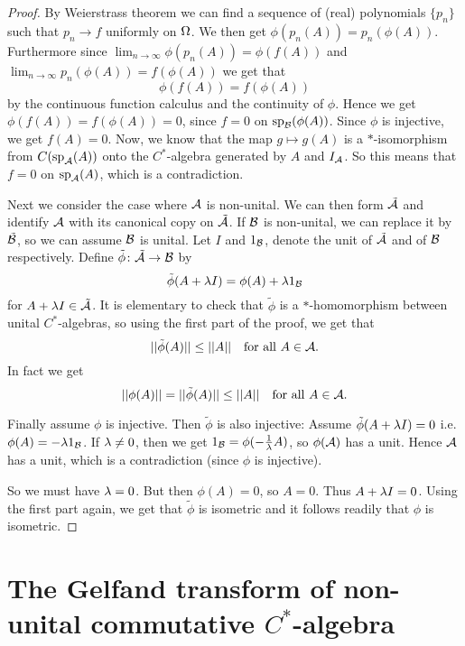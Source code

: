 \documentclass[10pt,english,a4paper]{article}
\theoremstyle{definition}
\DeclareMathOperator{\Sp}{sp}
\begin{document}
\begin{proof}
By Weierstrass theorem we can find a sequence of (real) polynomials $\{p_n\}$
such that $p_n \to f$ uniformly on $\Omega$. We then get $\phi(p_n(A)) = p_n(\phi(A))$. Furthermore 
since $\lim_{n\to\infty} \phi(p_n(A)) = \phi(f(A))$ and $\lim_{n \to \infty}
p_n(\phi(A)) = f(\phi(A))$ we get that \[\phi(f(A)) = f(\phi(A))\] by the
continuous function calculus and the continuity of $\phi$.
Hence we get $\phi(f(A)) = f(\phi(A)) = 0$, since $f = 0$ on $\Sp_{\Bs}(\phi(A))$. 
Since $\phi$ is injective, we get $f(A) = 0$. Now, we know that the map $g \mapsto g(A)$
is a $*$-isomorphism from $C(\Sp_{\As}(A))$ onto the $C^*$-algebra generated 
by $A$ and $I_{\mathcal{A}}$. So this means that $f=0$ on $\Sp_{\As}(A)$, which is a contradiction. 

Next we consider the case where $\mathcal{A}$ is non-unital. 
We can then form $\tilde{\mathcal{A}}$ and identify $\mathcal{A}$ with its canonical copy on $\tilde{\mathcal{A}}$.
If $\mathcal{B}$ is non-unital, we can replace it by $\tilde{\mathcal{B}}$, so we can assume $\mathcal{B}$ is 
unital. Let $I$ and $1_{\mathcal{B}}$, denote the unit of $\tilde{\mathcal{A}}$ and of $\mathcal{B}$ 
respectively. Define $\tilde{\phi}\colon \tilde{\mathcal{A}} \to \mathcal{B}$ by 
\[ \tilde{\phi}(A + \lambda I) = \phi(A) + \lambda 1_{\mathcal{B}} \]
for $A + \lambda I \in \tilde{\mathcal{A}}$. It is elementary to check that 
$\tilde{\phi}$ is a $*$-homomorphism between unital $C^*$-algebras, so using 
the first part of the proof, we get that 
\[ ||\tilde{\phi}(A) || \leq ||A|| \quad \text{for all } A \in \mathcal{A}.\]
In fact we get 
\[ ||\phi(A)|| = ||\tilde{\phi}(A)|| \leq||A|| \quad \text{for all }A \in \mathcal{A}. \]

Finally assume $\phi$ is injective. Then $\tilde{\phi}$ is also injective:
Assume $\tilde{\phi}(A + \lambda I) = 0$ i.e. $\phi(A) = - \lambda 1_{\mathcal{B}}$.
If $\lambda \neq 0$, then we get $1_{\mathcal{B}} = \phi(-\tfrac{1}{\lambda}A)$, so $\phi(\mathcal{A})$
has a unit. Hence $\mathcal{A}$ has a unit, which is a contradiction (since $\phi$ is injective).

So we must have $\lambda =0$. But then $\phi(A) = 0$, so $A = 0$. Thus $A+ \lambda I = 0$. 
Using the first part again, we get that $\tilde{\phi}$ is isometric and it follows readily 
that $\phi$ is isometric. 


\end{proof}

\section{The Gelfand transform of non-unital commutative $C^*$-algebra}
\end{document}
